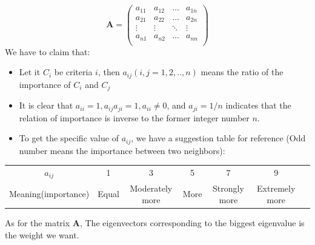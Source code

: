 \documentclass{mcmthesis}
\begin{document}
\[ \mathbf{A} = \left(
\begin{array}{cccc}
a_{11} & a_{12} & \ldots & a_{1n}\\
a_{21} & a_{22} & \ldots & a_{2n}\\
\vdots & \vdots & \ddots & \vdots\\
a_{n1} & a_{n2} & \ldots & a_{nn}\\
\end{array} \right) \]
We have to claim that:
\begin{itemize}
	\item  Let it $C_i$ be criteria $i$, then $a_{ij} (i,j=1,2,..,n)$ means the ratio of the importance of $C_i$ and $C_j$
	\item It is clear that $a_{ii}=1, a_{ij}a_{ji}=1, a_{ii}\ne0$, and $a_{ji}=1/n$ indicates that the relation of importance is inverse to the former integer number $n$.
	\item To get the specific value of $a_{ij}$, we have a suggestion table for reference (Odd number means the importance between two neighbors):%
	\end{itemize}
	\begin{table}[!htbp]
  \small
  \centering
    \begin{tabular}{ccccccc}
    \toprule
    $a_{ij}$ & 1&3&5&7&9\\
    Meaning(importance) &Equal&Moderately more&More&Strongly more&Extremely more\\
   
    \midrule 
    \end{tabular}%
\end{table}%

As for the matrix $\mathbf{A}$, The eigenvectors corresponding to the biggest eigenvalue is the weight we want.
\end{document}
